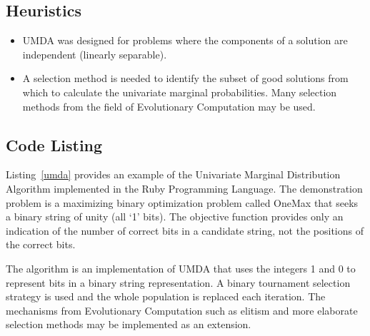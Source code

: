 \subsection{Heuristics}
\begin{itemize}
	\item UMDA was designed for problems where the components of a solution are independent (linearly separable).
	\item A selection method is needed to identify the subset of good solutions from which to calculate the univariate marginal probabilities. Many selection methods from the field of Evolutionary Computation may be used.
\end{itemize}

\subsection{Code Listing}
Listing~\ref{umda} provides an example of the Univariate Marginal Distribution Algorithm implemented in the Ruby Programming Language. 
The demonstration problem is a maximizing binary optimization problem called OneMax that seeks a binary string of unity (all `1' bits). The objective function provides only an indication of the number of correct bits in a candidate string, not the positions of the correct bits.

The algorithm is an implementation of UMDA that uses the integers 1 and 0 to represent bits in a binary string representation. A binary tournament selection strategy is used and the whole population is replaced each iteration. The mechanisms from Evolutionary Computation such as elitism and more elaborate selection methods may be implemented as an extension.

